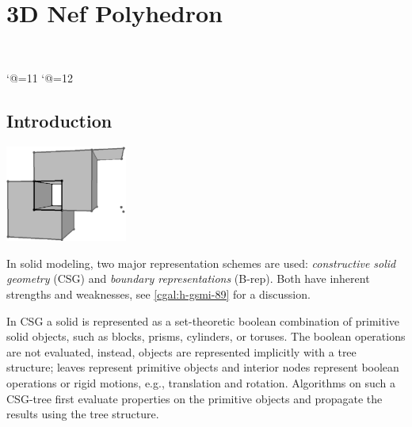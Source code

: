 
\ccParDims

\chapter{3D Nef Polyhedron}
\label{chapterNef_3}
\\

\catcode`@=11
\newcommand{\pyr}{\mathop{\operator@font Pyr}\nolimits}
\newcommand{\aff}{\mathop{\operator@font aff}\nolimits}
\catcode`@=12

\minitoc

\section{Introduction}

\begin{ccTexOnly}
    \vspace*{-20mm}
    \begin{flushright}
      \parbox{0.3\textwidth}{%
          \includegraphics[width=0.3\textwidth]{Nef_3/fig/nef_non_manifold3a.ps}%
      }%
    \end{flushright}
\end{ccTexOnly}

In solid modeling, two major representation schemes are used:
\emph{constructive solid geometry} (CSG) and \emph{boundary
  representations} (B-rep). Both have inherent strengths and
weaknesses, see \ref{cgal:h-gsmi-89} for a discussion.


In CSG a solid is represented as a set-theoretic boolean combination
of primitive solid objects, such as blocks, prisms, cylinders, or
toruses.  The boolean operations are not evaluated, instead, objects
are represented implicitly with a tree structure; leaves represent
primitive objects and interior nodes represent boolean operations or
rigid motions, e.g., translation and rotation. Algorithms on such a
CSG-tree first evaluate properties on the primitive objects and
propagate the results using the tree structure.
 
